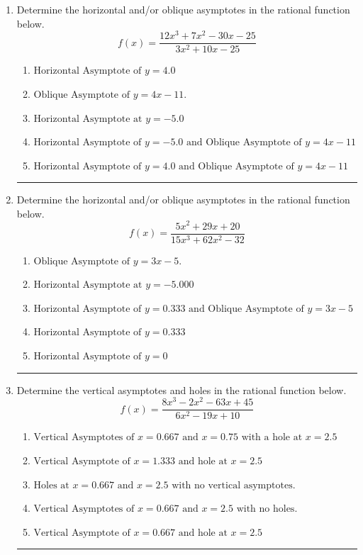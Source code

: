 \documentclass[14pt]{extbook}
\newcommand{\litem}[1]{\item#1\hspace*{-1cm}\rule{\textwidth}{0.4pt}}
\begin{document}
\begin{enumerate}
{\begin{enumerate}[label=\Alph*.]
\end{enumerate} }
\litem{
Determine the horizontal and/or oblique asymptotes in the rational function below.\[ f(x) = \frac{12x^{3} +7 x^{2} -30 x -25}{3x^{2} +10 x -25} \]\begin{enumerate}[label=\Alph*.]
\item \( \text{Horizontal Asymptote of } y = 4.0  \)
\item \( \text{Oblique Asymptote of } y = 4x -11. \)
\item \( \text{Horizontal Asymptote at } y = -5.0 \)
\item \( \text{Horizontal Asymptote of } y = -5.0 \text{ and Oblique Asymptote of } y = 4x -11 \)
\item \( \text{Horizontal Asymptote of } y = 4.0 \text{ and Oblique Asymptote of } y = 4x -11 \)

\end{enumerate} }
\litem{
Determine the horizontal and/or oblique asymptotes in the rational function below.\[ f(x) = \frac{5x^{2} +29 x + 20}{15x^{3} +62 x^{2} -32} \]\begin{enumerate}[label=\Alph*.]
\item \( \text{Oblique Asymptote of } y = 3x -5. \)
\item \( \text{Horizontal Asymptote at } y = -5.000 \)
\item \( \text{Horizontal Asymptote of } y = 0.333 \text{ and Oblique Asymptote of } y = 3x -5 \)
\item \( \text{Horizontal Asymptote of } y = 0.333  \)
\item \( \text{Horizontal Asymptote of } y = 0 \)

\end{enumerate} }
\litem{
Determine the vertical asymptotes and holes in the rational function below.\[ f(x) = \frac{8x^{3} -2 x^{2} -63 x + 45}{6x^{2} -19 x + 10} \]\begin{enumerate}[label=\Alph*.]
\item \( \text{Vertical Asymptotes of } x = 0.667 \text{ and } x = 0.75 \text{ with a hole at } x = 2.5 \)
\item \( \text{Vertical Asymptote of } x = 1.333 \text{ and hole at } x = 2.5 \)
\item \( \text{Holes at } x = 0.667 \text{ and } x = 2.5 \text{ with no vertical asymptotes.} \)
\item \( \text{Vertical Asymptotes of } x = 0.667 \text{ and } x = 2.5 \text{ with no holes.} \)
\item \( \text{Vertical Asymptote of } x = 0.667 \text{ and hole at } x = 2.5 \)


\end{enumerate}}
\end{enumerate}
\end{document}
